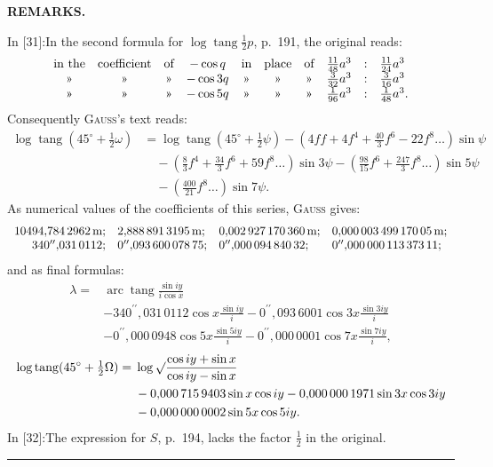\par\clearpage
\noindent{}\hfill{\small\textbf{REMARKS.}}\hfill\null\par\medskip

{\small
\noindent In [31]:\quad In the second formula for \(\log\operatorname{tang}\tfrac12 p\), p.\ 191, the original reads:
\[
\begin{array}{cccc@{\quad}ccc@{\quad}rcl}
\text{in the}&\text{coefficient}&\text{of}&-\cos q&
 \text{in}&\text{place}&\text{of}&\tfrac{11}{48}a^3&:&\tfrac{11}{24}a^3\\
\text{»}&\text{»}&\text{»}&-\cos3q&
 \text{»}&\text{»}&\text{»}&\tfrac3{32}a^3&:&\tfrac3{16}a^3\\
\text{»}&\text{»}&\text{»}&-\cos5q&
 \text{»}&\text{»}&\text{»}&\tfrac1{96}a^3&:&\tfrac1{48}a^3.
\end{array}
\]
\noindent Consequently \textsc{Gauss}'s text reads:
\[
\begin{aligned}
\log\operatorname{tang}(45^\circ+\tfrac12\omega)
 &=\log\operatorname{tang}(45^\circ+\tfrac12\psi)
 -\left(4ff+4f^4+\frac{40}3f^6-22f^8\ldots\right)\sin\psi\\
 &\quad-\left(\frac83f^4+\frac{34}3f^6+59f^8\ldots\right)\sin3\psi
 -\left(\frac{98}{15}f^6+\frac{247}3f^8\ldots\right)\sin5\psi\\
 &\quad-\left(\frac{400}{21}f^8\ldots\right)\sin7\psi.
\end{aligned}
\]
\noindent As numerical values of the coefficients of this series, \textsc{Gauss} gives:
\[
\begin{array}{r@{\quad}l@{\quad}l@{\quad}l}
10494{,}784\,2962\,\mathrm m;&2{,}888\,891\,3195\,\mathrm m;&
0{,}002\,927\,170\,360\,\mathrm m;&0{,}000\,003\,499\,170\,05\,\mathrm m;\\
340^{\prime\prime}{,}031\,0112;&0^{\prime\prime}{,}093\,600\,078\,75;&
0^{\prime\prime}{,}000\,094\,840\,32;&0^{\prime\prime}{,}000\,000\,113\,373\,11;
\end{array}
\]
\noindent and as final formulas:
\[
\begin{aligned}
\lambda={}&\operatorname{arc}\operatorname{tang}\frac{\sin iy}{i\cos x}\\
&-340^{\prime\prime}{,}031\,0112\cos x\frac{\sin iy}{i}
 -0^{\prime\prime}{,}093\,6001\cos3x\frac{\sin3iy}{i}\\
&-0^{\prime\prime}{,}000\,0948\cos5x\frac{\sin5iy}{i}
 -0^{\prime\prime}{,}000\,0001\cos7x\frac{\sin7iy}{i},
\end{aligned}
\]
\[
\begin{aligned}
\log\operatorname{tang}(45^\circ+\tfrac12\Omega)
={}&\log\surd\frac{\cos iy+\sin x}{\cos iy-\sin x}\\
&-0{,}000\,715\,9403\sin x\cos iy
 -0{,}000\,000\,1971\sin3x\cos3iy\\
&-0{,}000\,000\,0002\sin5x\cos5iy.
\end{aligned}
\]
\noindent In [32]:\quad The expression for \(S\), p.\ 194, lacks the factor \(\tfrac12\) in the original.
\begin{center}\rule{.24\linewidth}{.4pt}\end{center}

}
